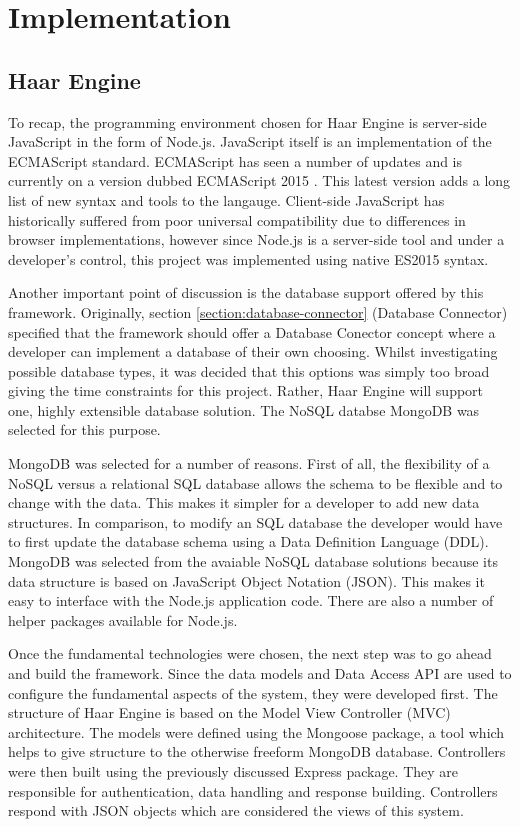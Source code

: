\chapter{Implementation}
  \section{Haar Engine}
    To recap, the programming environment chosen for Haar Engine is server-side JavaScript in the form of Node.js. JavaScript itself is an implementation of the ECMAScript standard. ECMAScript has seen a number of updates and is currently on a version dubbed ECMAScript 2015 \citep{es2015}. This latest version adds a long list of new syntax and tools to the langauge. Client-side JavaScript has historically suffered from poor universal compatibility due to differences in browser implementations, however since Node.js is a server-side tool and under a developer's control, this project was implemented using native ES2015 syntax.

    Another important point of discussion is the database support offered by this framework. Originally, section \ref{section:database-connector} (Database Connector) specified that the framework should offer a Database Conector concept where a developer can implement a database of their own choosing. Whilst investigating possible database types, it was decided that this options was simply too broad giving the time constraints for this project. Rather, Haar Engine will support one, highly extensible database solution. The NoSQL databse MongoDB was selected for this purpose.

    MongoDB was selected for a number of reasons. First of all, the flexibility of a NoSQL versus a relational SQL database allows the schema to be flexible and to change with the data. This makes it simpler for a developer to add new data structures. In comparison, to modify an SQL database the developer would have to first update the database schema using a Data Definition Language (DDL). MongoDB was selected from the avaiable NoSQL database solutions because its data structure is based on JavaScript Object Notation (JSON). This makes it easy to interface with the Node.js application code. There are also a number of helper packages available for Node.js.

    Once the fundamental technologies were chosen, the next step was to go ahead and build the framework. Since the data models and Data Access API are used to configure the fundamental aspects of the system, they were developed first. The structure of Haar Engine is based on the Model View Controller (MVC) architecture. The models were defined using the Mongoose package, a tool which helps to give structure to the otherwise freeform MongoDB database. Controllers were then built using the previously discussed Express package. They are responsible for authentication, data handling and response building. Controllers respond with JSON objects which are considered the views of this system.

